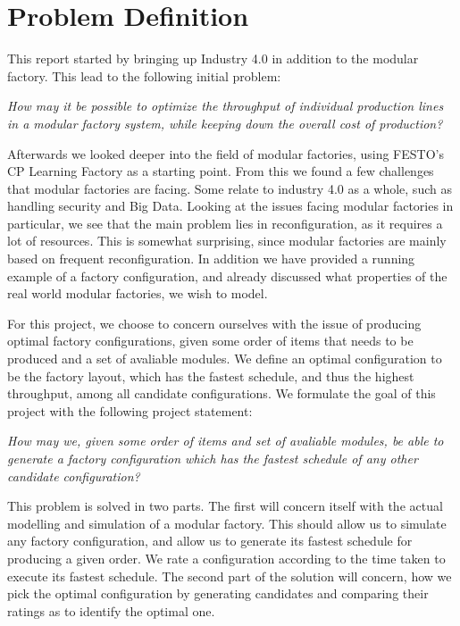 \section{Problem Definition}\label{ch:problemdefinition}
This report started by bringing up Industry 4.0 in addition to the modular factory. This lead to the following initial problem:

\bigskip
\textit{How may it be possible to optimize the throughput of individual production lines in a modular factory system, while keeping down the overall cost of production?}
\bigskip

Afterwards we looked deeper into the field of modular factories, using FESTO's CP Learning Factory as a starting point. From this we found a few challenges that modular factories are facing. Some relate to industry 4.0 as a whole, such as handling security and Big Data. Looking at the issues facing modular factories in particular, we see that the main problem lies in reconfiguration, as it requires a lot of resources. This is somewhat surprising, since modular factories are mainly based on frequent reconfiguration. In addition we have provided a running example of a factory configuration, and already discussed what properties of the real world modular factories, we wish to model.

For this project, we choose to concern ourselves with the issue of producing optimal factory configurations, given some order of items that needs to be produced and a set of avaliable modules. We define an optimal configuration to be the factory layout, which has the fastest schedule, and thus the highest throughput, among all candidate configurations. We formulate the goal of this project with the following project statement:

\bigskip
\textit{How may we, given some order of items and set of avaliable modules, be able to generate a factory configuration which has the fastest schedule of any other candidate configuration?}
\bigskip

This problem is solved in two parts. The first will concern itself with the actual modelling and simulation of a modular factory. This should allow us to simulate any factory configuration, and allow us to generate its fastest schedule for producing a given order. We rate a configuration according to the time taken to execute its fastest schedule. The second part of the solution will concern, how we pick the optimal configuration by generating candidates and comparing their ratings as to identify the optimal one. 
